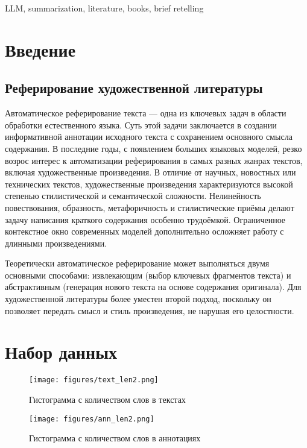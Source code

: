 \documentclass{article}
\theoremstyle{definition}
\theoremstyle{plain}
\begin{document}
\begin{altkeywords}
LLM, summarization, literature, books, brief retelling
\end{altkeywords}


\section*{Введение}
\subsection*{Реферирование художественной литературы}
Автоматическое реферирование текста — одна из ключевых задач в области обработки естественного языка. Суть этой задачи заключается в создании информативной аннотации исходного текста с сохранением основного смысла содержания. В последние годы, с появлением больших языковых моделей, резко возрос интерес к автоматизации реферирования в самых разных жанрах текстов, включая художественные произведения. В отличие от научных, новостных или технических текстов, художественные произведения характеризуются высокой степенью стилистической и семантической сложности. Нелинейность повествования, образность, метафоричность и стилистические приёмы делают задачу написания краткого содержания особенно трудоёмкой. Ограниченное контекстное окно современных моделей дополнительно осложняет работу с длинными произведениями.

Теоретически автоматическое реферирование может выполняться двумя основными способами: извлекающим (выбор ключевых фрагментов текста) и абстрактивным (генерация нового текста на основе содержания оригинала). Для художественной литературы более уместен второй подход, поскольку он позволяет передать смысл и стиль произведения, не нарушая его целостности.

\section*{Набор данных}
\begin{figure}[h!]
    \centering
    \begin{minipage}[t]{0.49\textwidth}
        \centering
        \texttt{[image: figures/text\_len2.png]}
        \caption{Гистограмма с количеством слов в текстах}
        \label{fig:text_len}
    \end{minipage}
    \hfill
    \begin{minipage}[t]{0.49\textwidth}
        \centering
        \texttt{[image: figures/ann\_len2.png]}
        \caption{Гистограмма с количеством слов в аннотациях}
        \label{fig:ann_len}
    \end{minipage}
\end{figure}
\end{document}
